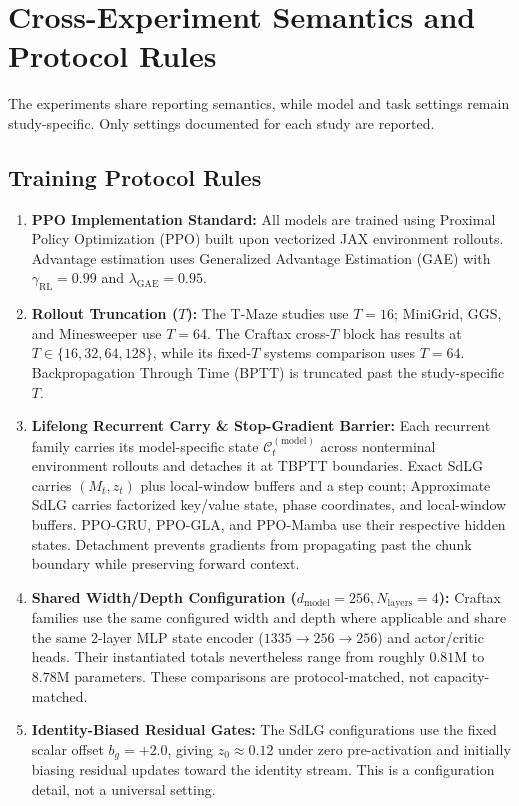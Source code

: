\section{Cross-Experiment Semantics and Protocol Rules}
\label{app:protocol_standards}

The experiments share reporting semantics, while model and task settings remain study-specific. Only settings documented for each study are reported.

\subsection{Training Protocol Rules}
\begin{enumerate}
    \item \textbf{PPO Implementation Standard:} All models are trained using Proximal Policy Optimization (PPO) \cite{schulman2017proximal} built upon vectorized JAX environment rollouts. Advantage estimation uses Generalized Advantage Estimation (GAE) with $\gamma_{\mathrm{RL}} = 0.99$ and $\lambda_{\mathrm{GAE}} = 0.95$.
    \item \textbf{Rollout Truncation ($T$):} The T-Maze studies use $T=16$; MiniGrid, GGS, and Minesweeper use $T=64$. The Craftax cross-$T$ block has results at $T\in\{16,32,64,128\}$, while its fixed-$T$ systems comparison uses $T=64$. Backpropagation Through Time (BPTT) is truncated past the study-specific $T$.
    \item \textbf{Lifelong Recurrent Carry \& Stop-Gradient Barrier:} Each recurrent family carries its model-specific state $\mathcal{C}^{(\mathrm{model})}_t$ across nonterminal environment rollouts and detaches it at TBPTT boundaries. Exact SdLG carries $(M_t,z_t)$ plus local-window buffers and a step count; Approximate SdLG carries factorized key/value state, phase coordinates, and local-window buffers. PPO-GRU, PPO-GLA, and PPO-Mamba use their respective hidden states. Detachment prevents gradients from propagating past the chunk boundary while preserving forward context.
    \item \textbf{Shared Width/Depth Configuration ($d_{\text{model}}=256, N_{\text{layers}}=4$):} Craftax families use the same configured width and depth where applicable and share the same 2-layer MLP state encoder ($1335 \to 256 \to 256$) and actor/critic heads. Their instantiated totals nevertheless range from roughly $0.81\text{M}$ to $8.78\text{M}$ parameters. These comparisons are protocol-matched, not capacity-matched.
    \item \textbf{Identity-Biased Residual Gates:} The SdLG configurations use the fixed scalar offset $b_g=+2.0$, giving $z_0\approx0.12$ under zero pre-activation and initially biasing residual updates toward the identity stream. This is a configuration detail, not a universal setting.
\end{enumerate}

